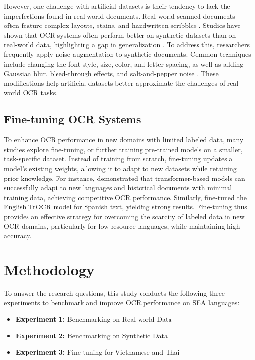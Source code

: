 \documentclass[12pt,oneside]{memoir}
\begin{document}
However, one challenge with artificial datasets is their tendency to lack the imperfections found in real-world documents. 
Real-world scanned documents often feature complex layouts, stains, and handwritten scribbles \parencite{hegghammer-2022}. 
Studies have shown that OCR systems often perform better on synthetic datasets than on real-world data, highlighting a gap in generalization \parencite{ignat-etal-2022}.
To address this, researchers frequently apply noise augmentation to synthetic documents. 
Common techniques include changing the font style, size, color, and letter spacing, as well as adding Gaussian blur, bleed-through effects, and salt-and-pepper noise \parencite{gupte-etal-2021, ignat-etal-2022}.
These modifications help artificial datasets better approximate the challenges of real-world OCR tasks.

\section{Fine-tuning OCR Systems}

To enhance OCR performance in new domains with limited labeled data, many studies explore fine-tuning, or further training pre-trained models on a smaller, task-specific dataset. 
Instead of training from scratch, fine-tuning updates a model's existing weights, allowing it to adapt to new datasets while retaining prior knowledge. 
For instance, \textcite{parres-and-paredes-2023} demonstrated that transformer-based models can successfully adapt to new languages and historical documents with minimal training data, achieving competitive OCR performance. 
Similarly, \textcite{laurent-and-lauar-2024} fine-tuned the English TrOCR model for Spanish text, yielding strong results.
Fine-tuning thus provides an effective strategy for overcoming the scarcity of labeled data in new OCR domains, particularly for low-resource languages, while maintaining high accuracy.


\chapter{Methodology}

To answer the research questions, this study conducts the following three experiments to benchmark and improve OCR performance on SEA languages:

\begin{itemize}
    \item \textbf{Experiment 1:} Benchmarking on Real-world Data
    \item \textbf{Experiment 2:} Benchmarking on Synthetic Data
    \item \textbf{Experiment 3:} Fine-tuning for Vietnamese and Thai
\end{itemize}
\end{document}
